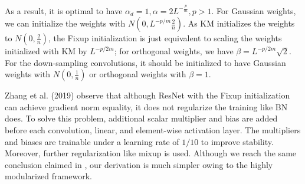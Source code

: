 \documentclass[10pt,journal,compsoc]{IEEEtran}
\begin{document}
As a result, it is optimal to have $\alpha_d=1,\alpha=2L^{-\frac{p}{m}}, p>1$. For Gaussian weights, we can initialize the weights with $N(0, L^{-p/m}\frac{2}{n})$. As KM initializes the weights to $N(0, \frac{2}{n})$, the Fixup initialization is just equivalent to scaling the weights initialized with KM by $L^{-p/2m}$; for orthogonal weights, we have $\beta=L^{-p/2m}\sqrt{2}$. For the down-sampling convolutions, it should be initialized to have Gaussian weights with $N(0, \frac{1}{n})$ or orthogonal weights with $\beta=1$.

Zhang et al. (2019) \cite{zhang2019fixup} observe that although ResNet with the Fixup initialization can achieve gradient norm equality, it does not regularize the training like BN does. To solve this problem, additional scalar multiplier and bias are added before each convolution, linear, and element-wise activation layer. The multipliers and biases are trainable under a learning rate of $1/10$ to improve stability. Moreover, further regularization like mixup \cite{zhang2017mixup} is used. Although we reach the same conclusion claimed in \cite{zhang2019fixup}, our derivation is much simpler owing to the highly modularized framework.

\begin{comment}
However, there is also drawbacks in the ``Plus One" trick: letting $\phi\left(\widetilde{\mathbf{J_i}}\widetilde{\mathbf{J_i}}^T\right) = O(\frac{1}{L^p})$ doesn't only washes out the instability in early layers, but also washes out the features computed by early layers, which leads to a problem called ``diminishing feature reuse" \cite{huang2016deep}. 

In , the authors observe that simply inserting scalar multipliers and biases in the branches could significantly recovers the training performance of ResNet with fixup initialization. We believe that the inserted multipliers and biases partially alleviate the ``diminishing feature reuse" problem, although this insight is not mentioned in their paper. 

Actually, there are multiple more sophisticated strategies aim at solving the ``diminishing feature reuse" problem. \cite{huang2016deep}.

\textbf{SeLU. }While the default setting of SeLU in \cite{klambauer2017self} works well in vanilla series neural networks, it would cause gradient explosion in ResNet, due to the reason that the residual connections are not handled by the theory of self-normalizing neural networks.
\end{comment}
\end{document}
